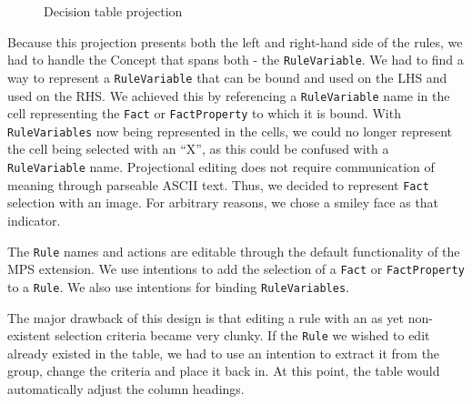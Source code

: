 \begin{figure}[h]
    \centering
    \caption{Decision table projection}
    \label{fig:decisionTableProjection}
\end{figure}

Because this projection presents both the left and right-hand side of the rules, we had to handle the Concept that spans both - the \texttt{RuleVariable}.
We had to find a way to represent a \texttt{RuleVariable} that can be bound and used on the LHS and used on the RHS.
We achieved this by referencing a \texttt{RuleVariable} name in the cell representing the \texttt{Fact} or \texttt{FactProperty} to which it is bound.
With \texttt{RuleVariables} now being represented in the cells, we could no longer represent the cell being selected with an ``X'', as this could be confused with a \texttt{RuleVariable} name.
Projectional editing does not require communication of meaning through parseable ASCII text.
Thus, we decided to represent \texttt{Fact} selection with an image.
For arbitrary reasons, we chose a smiley face as that indicator.

The \texttt{Rule} names and actions are editable through the default functionality of the MPS extension.
We use intentions to add the selection of a \texttt{Fact} or \texttt{FactProperty} to a \texttt{Rule}.
We also use intentions for binding \texttt{RuleVariables}.

The major drawback of this design is that editing a rule with an as yet non-existent selection criteria became very clunky.
If the \texttt{Rule} we wished to edit already existed in the table, we had to use an intention to extract it from the group, change the criteria and place it back in.
At this point, the table would automatically adjust the column headings.

